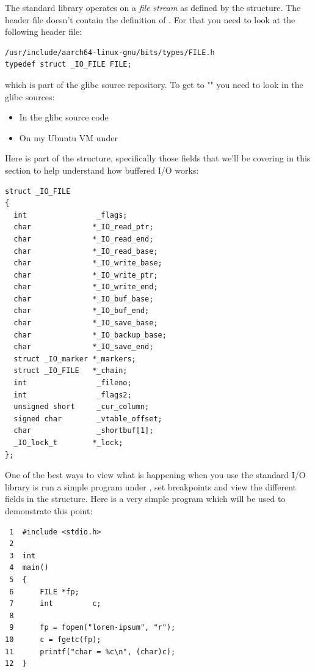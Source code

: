 \noindent
The standard library operates on a \textit{file stream} as defined by the  structure. The  header file doesn't contain the definition of . For that you need to look at the following header file:

\begin{lstlisting}
/usr/include/aarch64-linux-gnu/bits/types/FILE.h
typedef struct _IO_FILE FILE;
\end{lstlisting}

\noindent
which is part of the glibc source repository. To get to "" you need to look in the glibc sources:

\begin{itemize}
	\item In the glibc source code
	\subitem {}
    	\item On my Ubuntu VM under 
	\subitem {}  
\end{itemize}

\noindent
Here is part of the structure, specifically those fields that we'll be covering in this section to help understand how buffered I/O works:

\begin{lstlisting}
struct _IO_FILE
{
  int                _flags;     
  char              *_IO_read_ptr;
  char              *_IO_read_end;  
  char              *_IO_read_base;  
  char              *_IO_write_base; 
  char              *_IO_write_ptr; 
  char              *_IO_write_end;  
  char              *_IO_buf_base;
  char              *_IO_buf_end;  
  char              *_IO_save_base;
  char              *_IO_backup_base;  
  char              *_IO_save_end; 
  struct _IO_marker *_markers;
  struct _IO_FILE   *_chain;
  int                _fileno;
  int                _flags2;
  unsigned short     _cur_column;
  signed char        _vtable_offset;
  char               _shortbuf[1];
  _IO_lock_t        *_lock;
};
\end{lstlisting}

\noindent
One of the best ways to view what is happening when you use the standard I/O library is run a simple program under , set breakpoints and view the different fields in the  structure. Here is a very simple program which will be used to demonstrate this point:

\begin{lstlisting}
 1  #include <stdio.h>
 2
 3  int
 4  main()
 5  {  
 6      FILE *fp;
 7      int         c; 
 8
 9      fp = fopen("lorem-ipsum", "r");
10      c = fgetc(fp);
11      printf("char = %c\n", (char)c);
12  }  
\end{lstlisting}


